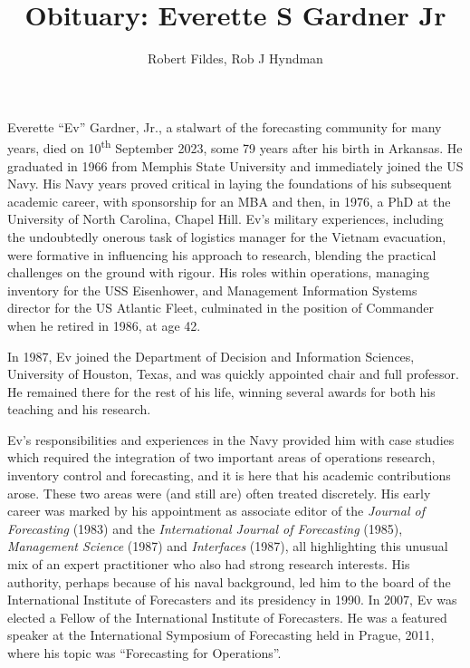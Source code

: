 \documentclass[11pt, a4paper]{article}
\begin{document}
\title{Obituary: Everette S Gardner Jr}
\author{Robert Fildes, Rob J Hyndman}
\maketitle

Everette ``Ev'' Gardner, Jr., a stalwart of the forecasting community for many years, died on 10\textsuperscript{th} September 2023, some 79 years after his birth in Arkansas. He graduated in 1966 from Memphis State University and immediately joined the US Navy. His Navy years proved critical in laying the foundations of his subsequent academic career, with sponsorship for an MBA and then, in 1976, a PhD \citep{phd} at the University of North Carolina, Chapel Hill. Ev's military experiences, including the undoubtedly onerous task of logistics manager for the Vietnam evacuation, were formative in influencing his approach to research, blending the practical challenges on the ground with rigour. His roles within operations, managing inventory for the USS Eisenhower, and Management Information Systems director for the US Atlantic Fleet, culminated in the position of Commander when he retired in 1986, at age 42.

In 1987, Ev joined the Department of Decision and Information Sciences, University of  Houston, Texas, and was quickly appointed chair and full professor. He remained there for the rest of his life, winning several awards for both his teaching and his research.

Ev's responsibilities and experiences in the Navy provided him with case studies which required the integration of two important areas of operations research, inventory control and forecasting, and it is here that his academic contributions arose. These two areas were (and still are) often treated discretely. His early career was marked by his appointment as associate editor of the \emph{Journal of Forecasting} (1983) and the \emph{International Journal of Forecasting} (1985), \emph{Management Science} (1987) and \emph{Interfaces} (1987), all highlighting this unusual mix of an expert practitioner who also had strong research interests. His authority, perhaps because of his naval background, led him to the board of the International Institute of Forecasters and its presidency in 1990. In 2007, Ev was elected a Fellow of the International Institute of Forecasters. He was a featured speaker at the International Symposium of Forecasting held in Prague, 2011, where his topic was ``Forecasting for Operations''.
\end{document}

